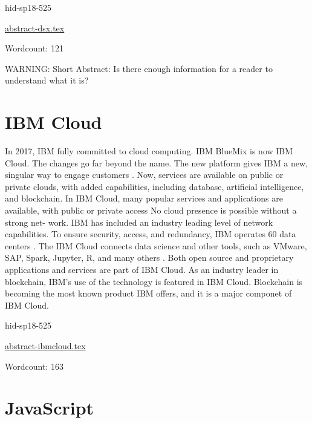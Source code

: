 \begin{IU}

hid-sp18-525

\href{https://github.com/cloudmesh-community/hid-sp18-525/blob/master//technology/abstract-dsx.tex}{abstract-dsx.tex}

 

Wordcount: 121

WARNING: Short Abstract: Is there enough information for a reader to understand what it is?

\end{IU}

\section{IBM Cloud}


In 2017, IBM fully committed to cloud computing. IBM BlueMix
is now IBM Cloud. The changes go far beyond the name. The new 
platform gives IBM a new, singular way to engage customers 
\cite{hid-sp18-525-cloud}. Now, services are available on public or 
private clouds, with added capabilities, including database, 
artificial intelligence, and blockchain\cite{hid-sp18-525-cloud}.
In IBM Cloud, many popular services and applications are 
available, with public or private access No cloud presence 
is possible without a strong net- work. IBM has included an 
industry leading level of network capabilities. To ensure 
security, access, and redundancy, IBM operates 60 data centers 
\cite{hid-sp18-525-cloud}.
The IBM Cloud connects data science and other tools, such as 
VMware, SAP, Spark, Jupyter, R, and many others 
\cite{hid-sp18-525-cloud}. Both open source and proprietary 
applications and services are part of IBM Cloud.
As an industry leader in blockchain, IBM’s use of the 
technology is featured in IBM Cloud. Blockchain is becoming 
the most known product IBM offers, and it is a major componet
of IBM Cloud\cite{hid-sp18-525-cloud}.


\begin{IU}

hid-sp18-525

\href{https://github.com/cloudmesh-community/hid-sp18-525/blob/master//technology/abstract-ibmcloud.tex}{abstract-ibmcloud.tex}

 

Wordcount: 163

\end{IU}

\section{JavaScript}


